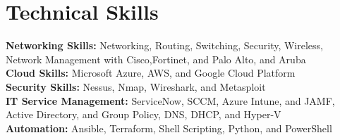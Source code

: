 
\section{Technical Skills}
 \begin{itemize}[leftmargin=0.15in, label={}]
    \small{\item{
      \textbf{\color{black}Networking Skills: }{Networking, Routing, Switching, Security, Wireless, Network Management with Cisco,Fortinet, and Palo Alto, and Aruba} \\
      \vspace{2pt}
      \textbf{\color{black}Cloud Skills: }{Microsoft Azure, AWS, and Google Cloud Platform} \\
      \vspace{2pt}
      \textbf{\color{black}Security Skills: }{Nessus, Nmap, Wireshark, and Metasploit} \\
      \vspace{2pt}
      \textbf{\color{black} IT Service Management: }{ServiceNow, SCCM, Azure Intune, and JAMF, Active Directory, and Group Policy, DNS, DHCP, and Hyper-V} \\
      \vspace{2pt}
      \textbf{\color{black} Automation: }{Ansible, Terraform, Shell Scripting, Python, and PowerShell} \\
      \vspace{2pt}
    }}

 \end{itemize}
